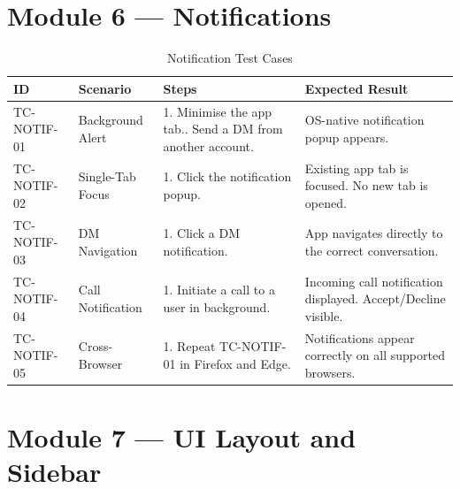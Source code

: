 \documentclass[11pt,a4paper]{report}
\begin{document}
\clearpage

\section{Module 6 --- Notifications}

\begin{xltabular}{\textwidth}{|L{2.5cm}|L{2.5cm}|X|L{3.5cm}|}
\caption{Notification Test Cases} \\
\hline
{} \textbf{ID} & \textbf{Scenario} & \textbf{Steps} & \textbf{Expected Result} \\ \hline
\endhead

TC-NOTIF-01 & Background Alert &
1. Minimise the app tab.. Send a DM from another account. &
OS-native notification popup appears. \\ \hline

TC-NOTIF-02 & Single-Tab Focus &
1. Click the notification popup. &
Existing app tab is focused. No new tab is opened. \\ \hline

TC-NOTIF-03 & DM Navigation &
1. Click a DM notification. &
App navigates directly to the correct conversation. \\ \hline

TC-NOTIF-04 & Call Notification &
1. Initiate a call to a user in background. &
Incoming call notification displayed. Accept/Decline visible. \\ \hline

TC-NOTIF-05 & Cross-Browser &
1. Repeat TC-NOTIF-01 in Firefox and Edge. &
Notifications appear correctly on all supported browsers. \\ \hline
\end{xltabular}

\clearpage

\section{Module 7 --- UI Layout and Sidebar}
\end{document}
